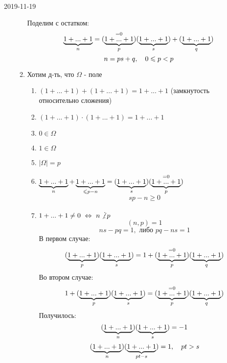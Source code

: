 \documentclass[main.tex]{subfiles}
\begin{document}
\begin{lect}{2019-11-19}
\begin{utv}
\begin{enumerate}
\begin{enumerate}
            Поделим с остатком:
            \[\ub{n}{1+...+1} = (\os{=0}{\ub{p}{1+...+1}})(\ub{s}{1+...+1})+(\ub{q}{1+...+1})\]
            \[n = ps + q,\q 0 \leq p < p\]
            \item Хотим д-ть, что $\Omega$ - поле
            \begin{enumerate}
              \item $(1+...+1) + (1+...+1) = 1+...+1$ (замкнутость относительно сложения)
              \item $(1+...+1) \cdot (1+...+1) = 1+...+1$
              \item $0 \in \Omega$
              \item $1 \in \Omega$
              \item $|\Omega| = p$
              \item $\ub{n}{1+...+1} + \ub{\leq p-n}{1+...+1} = (\ub{s}{1+...+1})(\os{=0}{\ub{p}{1+...+1}})$
              \[sp - n \geq 0\]
              \item $1+...+1 \neq 0\ \lra \ n \not \devides p$
              \[(n,p) = 1\]
              \[ns - pq = 1, \text{ либо } pq - ns = 1\]
              В первом случае:
              \[(\ub{p}{1+...+1})(\ub{s}{1+...+1}) = 1 + (\os{=0}{\ub{p}{1+...+1}})(\ub{q}{1+...+1})\]
              Во втором случае:
              \[1 + (\ub{p}{1+...+1})(\ub{s}{1+...+1}) = (\os{=0}{\ub{p}{1+...+1}})(\ub{q}{1+...+1})\]
              Получилось:
              \[(\ub{n}{1+...+1})(\ub{s}{1+...+1}) = -1\]
              \[(\ub{n}{1+...+1})(\ub{pt-s}{1+...+1})=1,\q pt > s\]
            \end{enumerate}
          \end{enumerate}
        \end{enumerate}
    \end{utv}
\end{lect}
\end{document}
